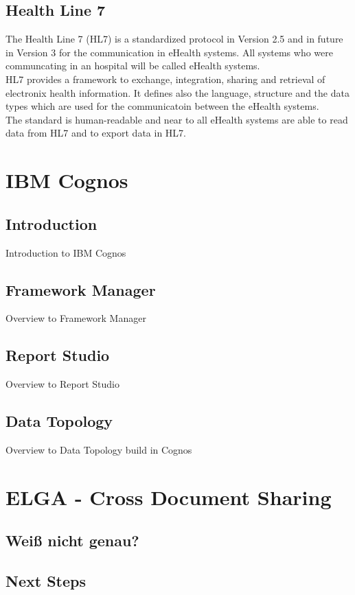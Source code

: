 \documentclass[a4paper]{article}
\begin{document}
	\subsection{Health Line 7}
		The Health Line 7 (HL7) is a standardized protocol in Version 2.5 and in
		future in Version 3 for the communication in eHealth systems. All systems
		who were communcating in an hospital will be called eHealth systems.\\
		HL7 provides a framework to exchange, integration, sharing and retrieval of
		electronix health information. It defines also the language, structure and the
		data types which are used for the communicatoin between the eHealth systems.\\
		The standard is human-readable and near to all eHealth systems are able to
		read data from HL7 and to export data in HL7.
		
	\newpage
	
	\section{IBM Cognos}
	\subsection{Introduction}
	Introduction to IBM Cognos
	\subsection{Framework Manager}
	Overview to Framework Manager
	\subsection{Report Studio}
	Overview to Report Studio
	\subsection{Data Topology}
	Overview to Data Topology build in Cognos
	
	\newpage
		
	\section{ELGA - Cross Document Sharing}
	\subsection{Weiß nicht genau?}
	\subsection{Next Steps}
	
\end{document}
